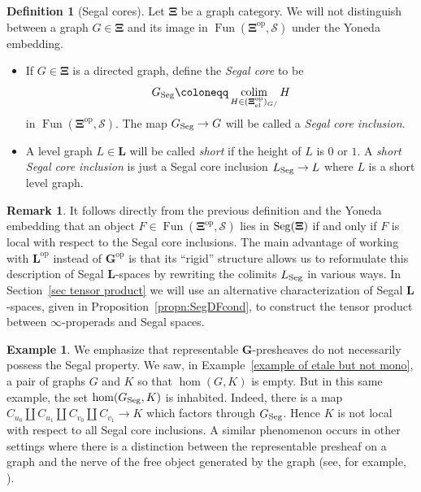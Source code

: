 \documentclass{amsart}
\numberwithin{theorem}{subsection}
\theoremstyle{definition}
\newtheorem{definition}[theorem]{Definition}
\newtheorem{example}[theorem]{Example}
\newtheorem{remark}[theorem]{Remark}
\providecommand{\op}{\mathrm{op}}
\providecommand{\xel}{\mathrm{el}}
\newcommand{\xFun}{\operatorname{Fun}}
\DeclareMathOperator*{\colim}{colim}
\newcommand{\xS}{\mathcal{S}}
\newcommand{\name}[1]{\ensuremath{\text{\textup{#1}}}}
\newcommand{\levelg}{\mathbf{L}}
\newcommand{\bbY}{\mathbf{G}}
\newcommand{\gc}{\mathbf{\Xi}}
\newcommand{\Seg}{\name{Seg}}
\begin{document}
\begin{definition}[Segal cores]\label{segal cores}
Let $\gc$ be a graph category.
We will not distinguish between a graph $G\in \gc$ and its image in $\xFun(\gc^{\op},\xS)$ under the Yoneda embedding.
\begin{itemize}
\item If $G\in \gc$ is a directed graph, define the \emph{Segal core} to be \[ G_{\Seg} \coloneqq \colim_{H\in (\gc^{\op}_{\xel})_{G/}} H\] in $\xFun(\gc^{\op},\xS)$.
The map $G_{\Seg} \to G$ will be called a \emph{Segal core inclusion}.
\item A level graph $L\in \levelg$ will be called \emph{short} if the height of $L$ is $0$ or $1$.
A \emph{short Segal core inclusion} is just a Segal core inclusion $L_{\Seg} \to L$ where $L$ is a short level graph.
\end{itemize}
\end{definition}

\begin{remark}\label{remark equiv segal and local}
	It follows directly from the previous definition and the Yoneda embedding that an object $F\in \xFun(\gc^{\op},\xS)$ lies in $\Seg(\gc)$ if and only if $F$ is local with respect to the Segal core inclusions.
	The main advantage of working with $\levelg^\op$ instead of $\bbY^\op$ is that its ``rigid'' structure allows us to reformulate this description of Segal $\levelg$-spaces by rewriting the colimits $L_{\Seg}$ in various ways. 
	In Section~\ref{sec tensor product} we will use an alternative characterization of Segal $\levelg$-spaces, given in Proposition~\ref{propn:SegDFcond}, to construct the tensor product between $\infty$-properads and Segal spaces.
\end{remark}

\begin{example}
We emphasize that representable $\bbY$-presheaves do not necessarily possess the Segal property.
We saw, in Example~\ref{example of etale but not mono}, a pair of graphs $G$ and $K$ so that $\hom(G,K)$ is empty.
But in this same example, the set $\hom(G_{\Seg},K)$ is inhabited.
Indeed, there is a map
$C_{u_0} \amalg C_{u_1} \amalg C_{v_0} \amalg C_{v_1} \to K$
which factors through $G_{\Seg}$.
Hence $K$ is not local with respect to all Segal core inclusions. 
A similar phenomenon occurs in other settings where there is a distinction between the representable presheaf on a graph and the nerve of the free object generated by the graph (see, for example, \cite[Remark 5.10]{HackneyRobertsonYau:HCO}).
\end{example}
\end{document}
